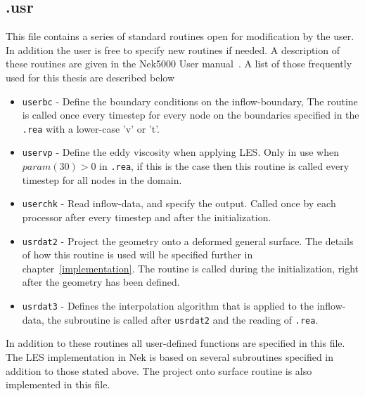 \subsection{.usr}
This file contains a series of standard routines open for modification by the user. In addition the user is free to specify 
new routines if needed. A description of these routines are given in the Nek5000 User manual~\cite{Nek}. A list of those 
frequently used for this thesis are described below 
%
%
\begin{itemize}
    \item \verb|userbc| - Define the boundary conditions on the inflow-boundary, The routine is called once every timestep 
        for every node on the boundaries specified in the \verb|.rea| with a lower-case 'v' or 't'.
    \item \verb|uservp| - Define the eddy viscosity when applying LES. Only in use when $param(30)>0$ in \verb|.rea|, if this is the case 
        then this routine is called every timestep for all nodes in the domain.
    \item \verb|userchk| - Read inflow-data, and specify the output. Called once by each
        processor after every timestep and after the initialization.
    \item \verb|usrdat2| - Project the geometry onto a deformed general surface. The details of how this routine is used will be 
    specified further in chapter~\ref{implementation}. The routine is called during the initialization, right after the geometry 
    has been defined.
    \item \verb|usrdat3| - Defines the interpolation algorithm that is applied to the inflow-data, the subroutine is called 
        after \verb|usrdat2| and the reading of \verb|.rea|.
\end{itemize}
%
In addition to these routines all user-defined functions are specified in this file. The LES implementation in Nek is based
on several subroutines specified in addition to those stated above. The project onto surface routine is also implemented 
in this file.

